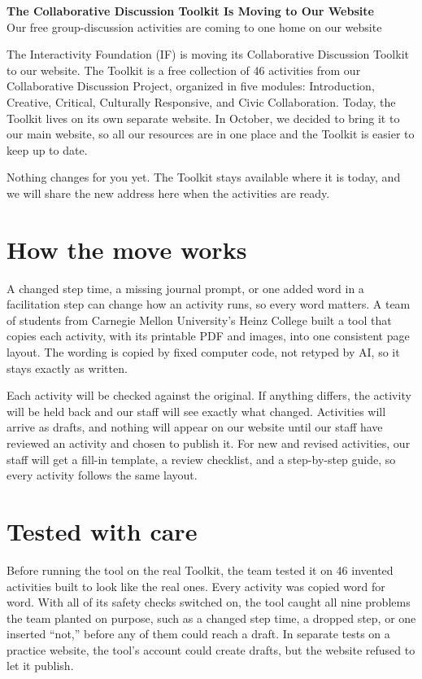 
\pagestyle{empty}


\begin{center}
{\LARGE\bfseries The Collaborative Discussion Toolkit Is Moving to Our Website}\\[4pt]
{\large Our free group-discussion activities are coming to one home on our website}
\end{center}

\vspace{4pt}
The Interactivity Foundation (IF) is moving its Collaborative Discussion Toolkit to our website. The Toolkit is a free collection of 46 activities from our Collaborative Discussion Project, organized in five modules: Introduction, Creative, Critical, Culturally Responsive, and Civic Collaboration. Today, the Toolkit lives on its own separate website. In October, we decided to bring it to our main website, so all our resources are in one place and the Toolkit is easier to keep up to date.

Nothing changes for you yet. The Toolkit stays available where it is today, and we will share the new address here when the activities are ready.

\section*{How the move works}
A changed step time, a missing journal prompt, or one added word in a facilitation step can change how an activity runs, so every word matters. A team of students from Carnegie Mellon University's Heinz College built a tool that copies each activity, with its printable PDF and images, into one consistent page layout. The wording is copied by fixed computer code, not retyped by AI, so it stays exactly as written.

Each activity will be checked against the original. If anything differs, the activity will be held back and our staff will see exactly what changed. Activities will arrive as drafts, and nothing will appear on our website until our staff have reviewed an activity and chosen to publish it. For new and revised activities, our staff will get a fill-in template, a review checklist, and a step-by-step guide, so every activity follows the same layout.

\section*{Tested with care}
Before running the tool on the real Toolkit, the team tested it on 46 invented activities built to look like the real ones. Every activity was copied word for word. With all of its safety checks switched on, the tool caught all nine problems the team planted on purpose, such as a changed step time, a dropped step, or one inserted ``not,'' before any of them could reach a draft. In separate tests on a practice website, the tool's account could create drafts, but the website refused to let it publish.

